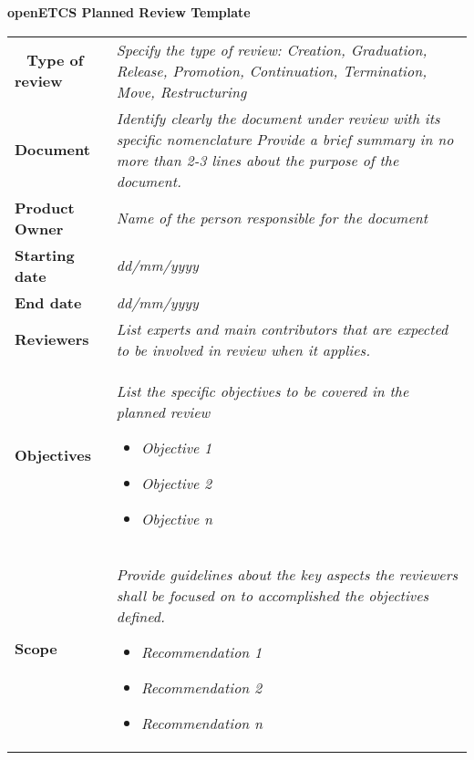 \documentclass[a4paper, 11pt]{article}
\newcommand{\ra}[1]{\renewcommand{\arraystretch}{#1}}
\begin{document}
\begin{center} \huge\bf openETCS Planned Review Template\end{center}

\vspace{1\baselineskip}\vspace{-\parskip}

\begin{flushleft}
\ra{1.5}
\begin{tabular}{|m{4cm}|m{19cm}|}
\hline
\rowcolor{myblue}
\multicolumn{2}{|c|}{Planned Review Template}
\\\hline\
\bf Type of review &
{\it Specify the type of review: Creation, Graduation, Release, Promotion, Continuation, Termination, Move, Restructuring}
\\\hline
\bf Document &
{\it Identify clearly the document under review with its specific nomenclature}
{\it Provide a brief summary in no more than 2-3 lines about the purpose of the document.}
\\\hline
\bf Product Owner &
{\it Name of the person responsible for the document}
\\\hline
\bf Starting date &
{\it dd/mm/yyyy}
\\\hline
\bf End date &
{\it dd/mm/yyyy}
\\\hline
\bf Reviewers &
{\it List experts and main contributors that are expected to be involved in review when it applies.}
\\\hline
\bf Objectives &
{\it List the specific objectives to be covered in the planned review}
\begin{itemize}
\item {\it Objective 1}
\item {\it Objective 2}
\item {\it Objective n}
\end{itemize}
\\\hline
\bf Scope & 
{\it Provide guidelines about the key aspects the reviewers shall be focused on to accomplished the objectives defined.}
\begin{itemize}
\item {\it Recommendation 1}
\item {\it Recommendation 2}
\item {\it Recommendation n}
\end{itemize}
\\\hline
\end{tabular}
\end{flushleft}
\end{document}
